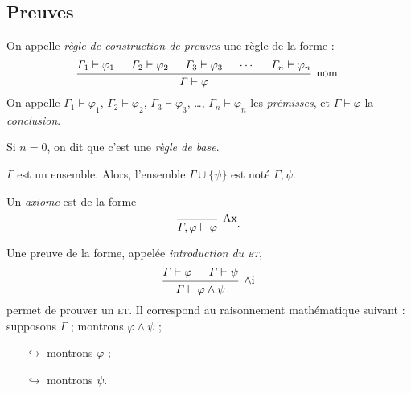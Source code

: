 \subsection{Preuves}

\begin{defn}
	On appelle \textit{règle de construction de preuves} une règle de la forme : \[
		\begin{prooftree}
			\hypo{\Gamma_1 \vdash \varphi_1}
			\hypo{\Gamma_2 \vdash \varphi_2}
			\hypo{\Gamma_3 \vdash \varphi_3} %
			\hypo{\cdots}
			\hypo{\Gamma_n \vdash \varphi_n}
			\infer5[nom]{\Gamma \vdash \varphi}
		\end{prooftree}
	.\]
	On appelle $\Gamma_1 \vdash \varphi_1$, $\Gamma_2 \vdash \varphi_2$, $\Gamma_3 \vdash \varphi_3$, \ldots, $\Gamma_n \vdash \varphi_n$\/ les \textit{prémisses}, et $\Gamma \vdash \varphi$\/ la \textit{conclusion}.

	Si $n = 0$, on dit que c'est une \textit{règle de base}.
	
\end{defn}

\begin{rmk}[Notation]
	$\Gamma$\/ est un ensemble. Alors, l'ensemble $\Gamma \cup \{\psi\}$\/ est noté $\Gamma,\psi$.
\end{rmk}

\begin{exm}
	Un \textit{axiome} est de la forme \[
		\begin{prooftree}
			\infer 0[Ax]{\Gamma, \varphi \vdash \varphi} %
		\end{prooftree}
	.\]

	Une preuve de la forme, appelée \textit{introduction du \textsc{et}}, \[
		\begin{prooftree}
			\hypo{\Gamma \vdash\varphi} %
			\hypo{\Gamma \vdash \psi}
			\infer 2[$\land$i]{\Gamma \vdash \varphi \land \psi}
		\end{prooftree}
	\] permet de prouver un \textsc{et}. Il correspond au raisonnement mathématique suivant : supposons $\Gamma$ ; montrons $\varphi \land \psi$\/ ;
	\begin{itemize}
		\item[$\hookrightarrow$] montrons $\varphi$\/ ;
		\item[$\hookrightarrow$] montrons $\psi$.
	\end{itemize}
\end{exm}

